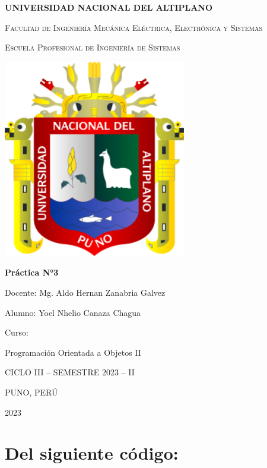 \documentclass[11pt,a4paper]{article}
\begin{document}
\begin{titlepage}
\centering


{\bfseries\LARGE UNIVERSIDAD NACIONAL DEL ALTIPLANO\par}
{\scshape\LARGE Facultad de Ingeniería Mecánica Eléctrica, Electrónica y Sistemas\par}
{\scshape\LARGE Escuela Profesional de Ingeniería de Sistemas\par}
\vspace{1cm}
{\includegraphics[width=0.6\textwidth]{images/1-unap.png}\par}
\vspace{0.5cm}
{\bfseries\LARGE Práctica N°3\par}
\vspace{1cm}
{\LARGE Docente: Mg. Aldo Hernan Zanabria Galvez \par}

{\LARGE Alumno: Yoel Nhelio Canaza Chagua \par}
\vspace{1cm}
{\LARGE Curso: \par}
{\LARGE Programación Orientada a Objetos II \par}
\vspace{1cm}
{\LARGE CICLO III – SEMESTRE 2023 – II \par}
{\LARGE PUNO, PERÚ \par}
{\LARGE 2023 \par}


\end{titlepage}

\section{Del siguiente código:}
\end{document}
